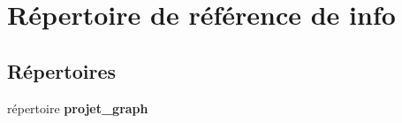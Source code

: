 \section{Répertoire de référence de info}
\label{dir_104ad9c0d6eb5598748ebd28ebbf7eed}
\subsection*{Répertoires}
\begin{DoxyCompactItemize}
\item 
répertoire {\bf projet\-\_\-graph}
\end{DoxyCompactItemize}
